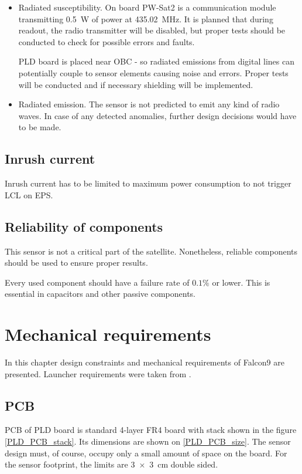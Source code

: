 \begin{itemize}
            \item Radiated susceptibility.
                On board PW-Sat2 is a communication module transmitting \SI{0.5}{\watt} of power at \SI{435.02}{\mega\hertz}. It is planned that during readout, the radio transmitter will be disabled, but proper tests should be conducted to check for possible errors and faults.

                PLD board is placed near OBC - so radiated emissions from digital lines can potentially couple to sensor elements causing noise and errors. Proper tests will be conducted and if necessary shielding will be implemented.

            \item Radiated emission.
                The sensor is not predicted to emit any kind of radio waves. In case of any detected anomalies, further design decisions would have to be made.

        \end{itemize}


    \subsection{Inrush current}
        Inrush current has to be limited to maximum power consumption to not trigger LCL on EPS.

    \subsection{Reliability of components}
        This sensor is not a critical part of the satellite. Nonetheless, reliable components should be used to ensure proper results.

        Every used component should have a failure rate of $0.1\si{\percent}$ or lower. This is essential in capacitors and other passive components.


\section{Mechanical requirements}
    In this chapter design constraints and mechanical requirements of Falcon9 are presented. Launcher requirements were taken from \cite{Falcon9_user_manual}.

    \subsection{PCB}
    \label{PCB_description}
        PCB of PLD board is standard 4-layer FR4 board with stack shown in the figure \ref{PLD_PCB_stack}. Its dimensions are shown on \ref{PLD_PCB_size}. The sensor design must, of course, occupy only a small amount of space on the board. For the sensor footprint, the limits are \SI{3x3}{\centi\meter} double sided.

